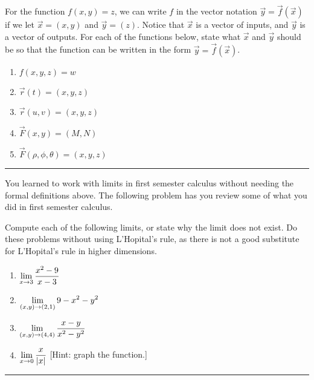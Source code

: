 \begin{problem}
 For the function $f(x,y)=z$, we can write $f$ in the vector notation $\vec y=\vec f(\vec x)$ if we let $\vec x=(x,y)$ and $\vec y=(z)$. Notice that $\vec x$ is a vector of inputs, and $\vec y$ is a vector of outputs. 
 For each of the functions below, state what $\vec x$ and $\vec y$ should be so that the function can be written in the form $\vec y = \vec f (\vec x)$.   
\begin{enumerate}
 \item $f(x,y,z)=w$
 \item $\vec r(t)=(x,y,z)$
 \item $\vec r(u,v)=(x,y,z)$
 \item $\vec F(x,y)=(M,N)$
 \item $\vec F(\rho,\phi,\theta)=(x,y,z)$
\end{enumerate}
\hrule\end{problem}


You learned to work with limits in first semester calculus without needing the formal definitions above. The following problem has you review some of what you did in first semester calculus.
\begin{problem}%
 Compute each of the following limits, or state why the limit does not exist. Do these problems without using L'Hopital's rule, as there is not a good substitute for L'Hopital's rule in higher dimensions. 
\begin{enumerate}
 \item $\displaystyle\lim_{x\to 3}\frac{x^2-9}{x-3}$
 \item $\displaystyle\lim_{(x,y)\to (2,1)} 9-x^2-y^2$
 \item $\displaystyle\lim_{(x,y)\to (4,4)} \frac{x-y}{x^2-y^2}$
 \item $\displaystyle\lim_{x\to 0}\frac{x}{|x|}$ [Hint: graph the function.]
\end{enumerate}
\hrule\end{problem}

